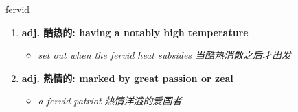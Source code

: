 
\begin{frame}
{\huge fervid}
\begin{center}
\begin{enumerate}\Large
  \item \textbf{adj. 酷热的: having a notably high temperature}
  \begin{itemize}
    \item \em{\Large{set out when the fervid heat subsides 当酷热消散之后才出发}}
  \end{itemize}
  \item \textbf{adj. 热情的: marked by great passion or zeal}
  \begin{itemize}
    \item \em{\Large{a fervid patriot 热情洋溢的爱国者}}
  \end{itemize}
\end{enumerate}
\end{center}
\end{frame}
